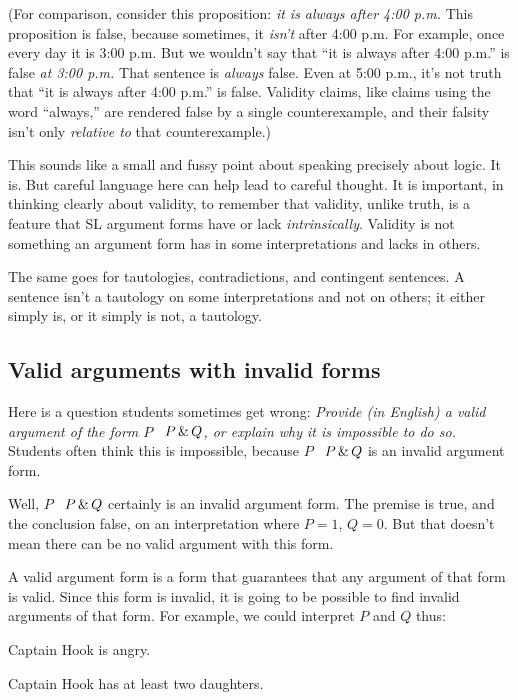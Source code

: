 (For comparison, consider this proposition: \emph{it is always after 4:00 p.m.} This proposition is false, because sometimes, it \emph{isn't} after 4:00 p.m. For example, once every day it is 3:00 p.m. But we wouldn't say that ``it is always after 4:00 p.m.'' is false \emph{at 3:00 p.m.} That sentence is \emph{always} false. Even at 5:00 p.m., it's not truth that ``it is always after 4:00 p.m.'' is false. Validity claims, like claims using the word ``always,'' are rendered false by a single counterexample, and their falsity isn't only \emph{relative to} that counterexample.)

This sounds like a small and fussy point about speaking precisely about logic. It is. But careful language here can help lead to careful thought. It is important, in thinking clearly about validity, to remember that validity, unlike truth, is a feature that SL argument forms have or lack \emph{intrinsically}. Validity is not something an argument form has in some interpretations and lacks in others.

The same goes for tautologies, contradictions, and contingent sentences. A sentence isn't a tautology on some interpretations and not on others; it either simply is, or it simply is not, a tautology.

\subsection{Valid arguments with invalid forms}

Here is a question students sometimes get wrong: \emph{Provide (in English) a valid argument of the form $P$ \therefore\ $P \,\&\, Q$, or explain why it is impossible to do so.} Students often think this is impossible, because $P$ \therefore\ $P \,\&\, Q$ is an invalid argument form.

Well,  $P$ \therefore\ $P \,\&\, Q$ certainly is an invalid argument form. The premise is true, and the conclusion false, on an interpretation where $P=1$, $Q=0$. But that doesn't mean there can be no valid argument with this form.

A valid argument form is a form that guarantees that any argument of that form is valid. Since this form is invalid, it is going to be possible to find invalid arguments of that form. For example, we could interpret $P$ and $Q$ thus:

\begin{ekey}
\item[P:] Captain Hook is angry.
\item[Q:] Captain Hook has at least two daughters.
\end{ekey}


